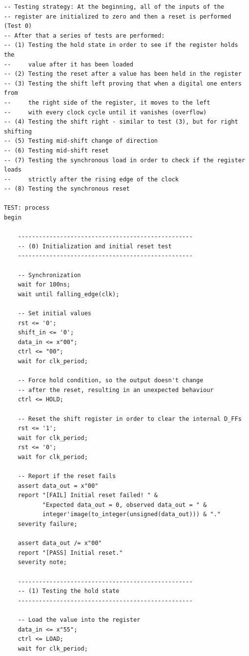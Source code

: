 \documentclass[10pt]{article}
\begin{document}
 \newpage
 \begin{verbatim}
-- Testing strategy: At the beginning, all of the inputs of the 
-- register are initialized to zero and then a reset is performed (Test 0)
-- After that a series of tests are performed: 
-- (1) Testing the hold state in order to see if the register holds the 
--     value after it has been loaded
-- (2) Testing the reset after a value has been held in the register
-- (3) Testing the shift left proving that when a digital one enters from 
--     the right side of the register, it moves to the left 
--     with every clock cycle until it vanishes (overflow) 
-- (4) Testing the shift right - similar to test (3), but for right shifting
-- (5) Testing mid-shift change of direction
-- (6) Testing mid-shift reset
-- (7) Testing the synchronous load in order to check if the register loads 
--     strictly after the rising edge of the clock
-- (8) Testing the synchronous reset

TEST: process
begin

    --------------------------------------------------
    -- (0) Initialization and initial reset test
    --------------------------------------------------

    -- Synchronization
    wait for 100ns;
    wait until falling_edge(clk);
    
    -- Set initial values
    rst <= '0';
    shift_in <= '0';
    data_in <= x"00";
    ctrl <= "00";
    wait for clk_period;
    
    -- Force hold condition, so the output doesn't change 
    -- after the reset, resulting in an unexpected behaviour
    ctrl <= HOLD;
    
    -- Reset the shift register in order to clear the internal D_FFs
    rst <= '1';
    wait for clk_period;
    rst <= '0';
    wait for clk_period;
    
    -- Report if the reset fails
    assert data_out = x"00"
    report "[FAIL] Initial reset failed! " &
           "Expected data_out = 0, observed data_out = " & 
           integer'image(to_integer(unsigned(data_out))) & "."
    severity failure;
    
    assert data_out /= x"00"
    report "[PASS] Initial reset."
    severity note;
    
    --------------------------------------------------
    -- (1) Testing the hold state
    --------------------------------------------------
    
    -- Load the value into the register
    data_in <= x"55";
    ctrl <= LOAD;
    wait for clk_period;
    

\end{verbatim}
\end{document}
